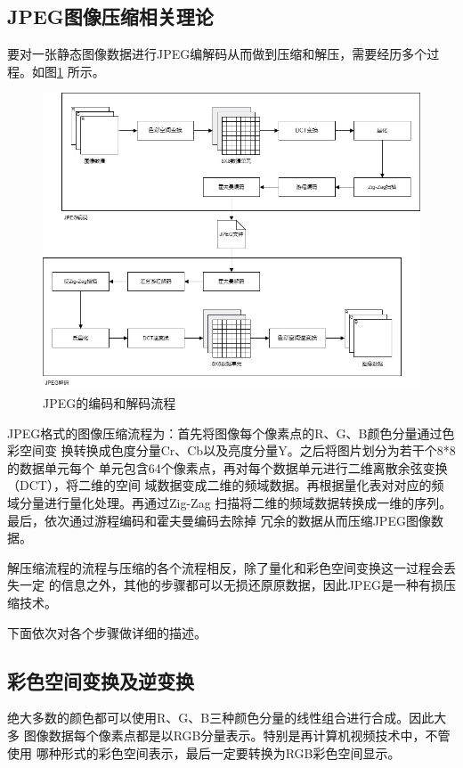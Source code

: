 \documentclass{article}
\numberwithin {equation}{section}
\begin{document}
\begin{spacing}{1.25}
\newpage
\section{JPEG图像压缩相关理论}
  要对一张静态图像数据进行JPEG编解码从而做到压缩和解压，需要经历多个过程。如图\ref{jpeg}
  所示。
  \begin{figure}[H]
    \centering
    \includegraphics[scale=0.6]{./pictures/图片1.png}
    \caption{JPEG的编码和解码流程}\label{jpeg}
  \end{figure}
  JPEG格式的图像压缩流程为：首先将图像每个像素点的R、G、B颜色分量通过色彩空间变
  换转换成色度分量Cr、Cb以及亮度分量Y。之后将图片划分为若干个8*8的数据单元每个
  单元包含64个像素点，再对每个数据单元进行二维离散余弦变换（DCT），将二维的空间
  域数据变成二维的频域数据。再根据量化表对对应的频域分量进行量化处理。再通过Zig-Zag
  扫描将二维的频域数据转换成一维的序列。最后，依次通过游程编码和霍夫曼编码去除掉
  冗余的数据从而压缩JPEG图像数据。

  解压缩流程的流程与压缩的各个流程相反，除了量化和彩色空间变换这一过程会丢失一定
  的信息之外，其他的步骤都可以无损还原原数据，因此JPEG是一种有损压缩技术。

  下面依次对各个步骤做详细的描述。
  \subsection{彩色空间变换及逆变换}
    \vspace{1em}
    绝大多数的颜色都可以使用R、G、B三种颜色分量的线性组合进行合成。因此大多
    图像数据每个像素点都是以RGB分量表示。特别是再计算机视频技术中，不管使用
    哪种形式的彩色空间表示，最后一定要转换为RGB彩色空间显示。


\end{spacing}
\end{document}

